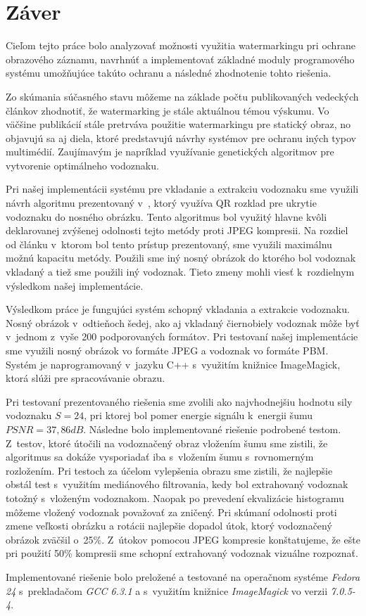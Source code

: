 \chapter{Záver}
Cieľom tejto práce bolo analyzovať možnosti využitia watermarkingu pri ochrane obrazového záznamu, navrhnúť a implementovať základné moduly programového systému umožňujúce takúto ochranu a následné zhodnotenie tohto riešenia.

Zo skúmania súčasného stavu môžeme na základe počtu publikovaných vedeckých článkov zhodnotiť, že watermarking je stále aktuálnou témou výskumu. Vo väčšine publikácií stále pretrváva použitie watermarkingu pre statický obraz, no objavujú sa aj diela, ktoré predstavujú návrhy systémov pre ochranu iných typov multimédií. Zaujímavým je napríklad využívanie genetických algoritmov pre vytvorenie optimálneho vodoznaku.

Pri našej implementácii systému pre vkladanie a extrakciu vodoznaku sme využili návrh algoritmu prezentovaný v~\cite{QRdecomposition}, ktorý využíva QR rozklad pre ukrytie vodoznaku do nosného obrázku. Tento algoritmus bol využitý hlavne kvôli deklarovanej zvýšenej odolnosti tejto metódy proti JPEG kompresii. Na rozdiel od článku v~ktorom bol tento prístup prezentovaný, sme využili maximálnu možnú kapacitu metódy. Použili sme iný nosný obrázok do ktorého bol vodoznak vkladaný a tiež sme použili iný vodoznak. Tieto zmeny mohli viesť k~rozdielnym výsledkom našej implementácie.

Výsledkom práce je fungujúci systém schopný vkladania a extrakcie vodoznaku. Nosný obrázok v~odtieňoch šedej, ako aj vkladaný čiernobiely vodoznak môže byť v~jednom z~vyše 200 podporovaných formátov. Pri testovaní našej implementácie sme využili nosný obrázok vo formáte JPEG a vodoznak vo formáte PBM. Systém je naprogramovaný v~jazyku C++ s~využitím knižnice ImageMagick, ktorá slúži pre spracovávanie obrazu.

Pri testovaní prezentovaného riešenia sme zvolili ako najvhodnejšiu hodnotu sily vodoznaku $S=24$, pri ktorej bol pomer energie signálu k~energii šumu $PSNR=37,86dB$. Následne bolo implementované riešenie podrobené testom. Z~testov, ktoré útočili na vodoznačený obraz vložením šumu sme zistili, že algoritmus sa dokáže vysporiadať iba s~vložením šumu s~rovnomerným rozložením. Pri testoch za účelom vylepšenia obrazu sme zistili, že najlepšie obstál test s~využitím mediánového filtrovania, kedy bol extrahovaný vodoznak totožný s~vloženým vodoznakom. Naopak po prevedení ekvalizácie histogramu môžeme vložený vodoznak považovať za zničený. Pri skúmaní odolnosti proti zmene veľkosti obrázku a rotácii najlepšie dopadol útok, ktorý vodoznačený obrázok zväčšil o~25\%. Z~útokov pomocou JPEG kompresie konštatujeme, že ešte pri použití 50\% kompresii sme schopní extrahovaný vodoznak vizuálne rozpoznať.

Implementované riešenie bolo preložené a testované na operačnom systéme {\it Fedora 24} s~prekladačom {\it GCC 6.3.1} a s~využitím knižnice {\it ImageMagick} vo verzii {\it 7.0.5-4}.